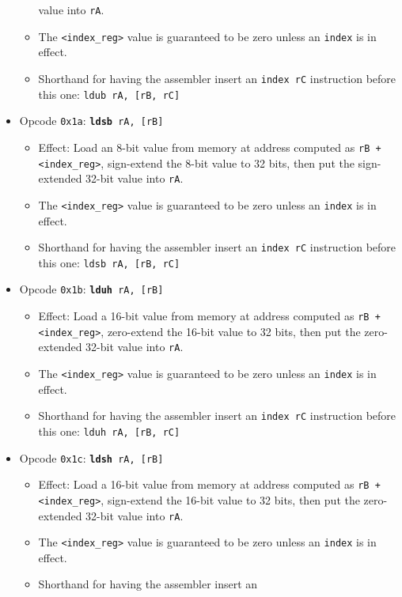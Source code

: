 \documentclass{article}
\begin{document}
\begin{itemize}
\begin{itemize}
		value into \texttt{rA}.
		\item The \texttt{<index\_reg>} value is guaranteed to be zero
		unless an \texttt{index} is in effect.
		\item Shorthand for having the assembler insert an
		\texttt{index rC} instruction before this one:
			\texttt{ldub rA, [rB, rC]}
		\end{itemize}
	\item Opcode \texttt{0x1a}:
		\texttt{\textbf{ldsb} rA, [rB]}
		\begin{itemize}
		\item Effect: Load an 8-bit value from memory at address
		computed as \texttt{rB + <index\_reg>}, sign-extend
		the 8-bit value to 32 bits, then put the sign-extended 32-bit
		value into \texttt{rA}.
		\item The \texttt{<index\_reg>} value is guaranteed to be zero
		unless an \texttt{index} is in effect.
		\item Shorthand for having the assembler insert an
		\texttt{index rC} instruction before this one:
			\texttt{ldsb rA, [rB, rC]}
		\end{itemize}
	\item Opcode \texttt{0x1b}:
		\texttt{\textbf{lduh} rA, [rB]}
		\begin{itemize}
		\item Effect: Load a 16-bit value from memory at address
		computed as \texttt{rB + <index\_reg>}, zero-extend
		the 16-bit value to 32 bits, then put the zero-extended 32-bit
		value into \texttt{rA}.
		\item The \texttt{<index\_reg>} value is guaranteed to be zero
		unless an \texttt{index} is in effect.
		\item Shorthand for having the assembler insert an
		\texttt{index rC} instruction before this one:
			\texttt{lduh rA, [rB, rC]}
		\end{itemize}
	\item Opcode \texttt{0x1c}:
		\texttt{\textbf{ldsh} rA, [rB]}
		\begin{itemize}
		\item Effect: Load a 16-bit value from memory at address
		computed as \texttt{rB + <index\_reg>}, sign-extend
		the 16-bit value to 32 bits, then put the zero-extended 32-bit
		value into \texttt{rA}.
		\item The \texttt{<index\_reg>} value is guaranteed to be zero
		unless an \texttt{index} is in effect.
		\item Shorthand for having the assembler insert an

\end{itemize}
\end{itemize}
\end{document}
